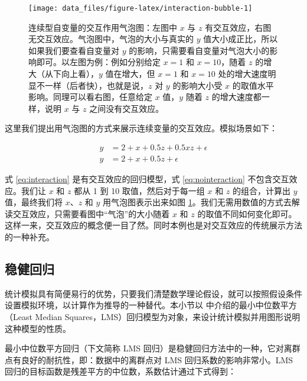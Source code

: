 \documentclass[
  b5paper,
  UTF8,twoside]{book}
\begin{document}
\begin{figure}

{\centering \texttt{[image: data\_files/figure-latex/interaction-bubble-1]} 

}

\caption[连续型自变量的交互作用气泡图]{连续型自变量的交互作用气泡图：左图中 \(x\) 与 \(z\) 有交互效应，右图无交互效应。气泡图中，气泡的大小与真实的 \(y\) 值大小成正比，所以如果我们要查看自变量对 \(y\) 的影响，只需要看自变量对气泡大小的影响即可。以左图为例：例如分别给定 \(x=1\) 和 \(x=10\)，随着 \(z\) 的增大（从下向上看），\(y\) 值在增大，但 \(x=1\) 和 \(x=10\) 处的增大速度明显不一样（后者快），也就是说，\(z\) 对 \(y\) 的影响大小受 \(x\) 的取值水平影响。同理可以看右图，任意给定 \(x\) 值，\(y\) 随着 \(z\) 的增大速度都一样，说明 \(x\) 与 \(z\) 之间没有交互效应。}\label{fig:interaction-bubble}
\end{figure}





这里我们提出用气泡图的方式来展示连续变量的交互效应。模拟场景如下：

\begin{align} 
y   &=  2+x+0.5z+0.5xz+\epsilon \label{eq:interaction} \\
y   &=  2+x+0.5z+\epsilon \label{eq:nointeraction}
\end{align}

式 \eqref{eq:interaction} 是有交互效应的回归模型，式 \eqref{eq:nointeraction} 不包含交互效应。我们让 \(x\) 和 \(z\) 都从 1 到 10 取值，然后对于每一组 \(x\) 和 \(z\) 的组合，计算出 \(y\) 值，最终我们将 \(x\)、\(z\) 和 \(y\) 用气泡图表示出来如图 \ref{fig:interaction-bubble}。我们无需用数值的方式去解读交互效应，只需要看图中``气泡''的大小随着 \(x\) 和 \(z\) 的取值不同如何变化即可。这样一来，交互效应的概念便一目了然。同时本例也是对交互效应的传统展示方法的一种补充。

\hypertarget{ux7a33ux5065ux56deux5f52}{%
\subsection{稳健回归}\label{ux7a33ux5065ux56deux5f52}}

统计模拟具有简便易行的优势，只要我们清楚数学理论假设，就可以按照假设条件设置模拟环境，以计算作为推导的一种替代。本小节以 \citet{Venables02} 中介绍的最小中位数平方（Least Median Squares，LMS）回归模型为对象，来设计统计模拟并用图形说明这种模型的性质。

最小中位数平方回归（下文简称 LMS 回归）是稳健回归方法中的一种，它对离群点有良好的耐抗性，即：数据中的离群点对 LMS 回归系数的影响非常小。LMS 回归的目标函数是残差平方的中位数，系数估计通过下式得到：
\end{document}
